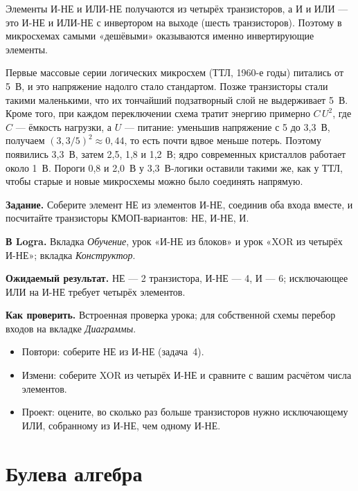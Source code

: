 Элементы И-НЕ и ИЛИ-НЕ получаются из четырёх транзисторов, а И и ИЛИ ---
это И-НЕ и ИЛИ-НЕ с инвертором на выходе (шесть транзисторов). Поэтому в
микросхемах самыми «дешёвыми» оказываются именно инвертирующие элементы.

\begin{infobox}[Почему 3,3~В]
Первые массовые серии логических микросхем (ТТЛ, 1960-е годы) питались от
5~В, и это напряжение надолго стало стандартом. Позже транзисторы стали
такими маленькими, что их тончайший подзатворный слой не выдерживает 5~В.
Кроме того, при каждом переключении схема тратит энергию примерно
$C\,U^2$, где $C$ --- ёмкость нагрузки, а $U$ --- питание: уменьшив
напряжение с 5 до 3,3~В, получаем $(3{,}3/5)^2\approx 0{,}44$, то есть почти
вдвое меньше потерь. Поэтому появились 3,3~В, затем 2,5, 1,8 и 1,2~В; ядро
современных кристаллов работает около 1~В. Пороги 0,8 и 2,0~В у 3,3~В-логики
оставили такими же, как у ТТЛ, чтобы старые и новые микросхемы можно было
соединять напрямую.
\end{infobox}

\begin{diybox}
\textbf{Задание.} Соберите элемент НЕ из элементов И-НЕ, соединив оба входа
вместе, и посчитайте транзисторы КМОП-вариантов: НЕ, И-НЕ, И.\par
\textbf{В Logra.} Вкладка \emph{Обучение}, урок «И-НЕ из блоков» и урок
«XOR из четырёх И-НЕ»; вкладка \emph{Конструктор}.\par
\textbf{Ожидаемый результат.} НЕ --- 2 транзистора, И-НЕ --- 4, И --- 6;
исключающее ИЛИ на И-НЕ требует четырёх элементов.\par
\textbf{Как проверить.} Встроенная проверка урока; для собственной схемы
перебор входов на вкладке \emph{Диаграммы}.
\begin{itemize}[leftmargin=3.4em,labelwidth=3em,labelsep=0.4em,align=left]
  \item[\stars{1}] Повтори: соберите НЕ из И-НЕ (задача~4).
  \item[\stars{2}] Измени: соберите XOR из четырёх И-НЕ и сравните с вашим расчётом
    числа элементов.
  \item[\stars{3}] Проект: оцените, во сколько раз больше транзисторов нужно
    исключающему ИЛИ, собранному из И-НЕ, чем одному И-НЕ.
\end{itemize}
\end{diybox}

\section{Булева алгебра}

